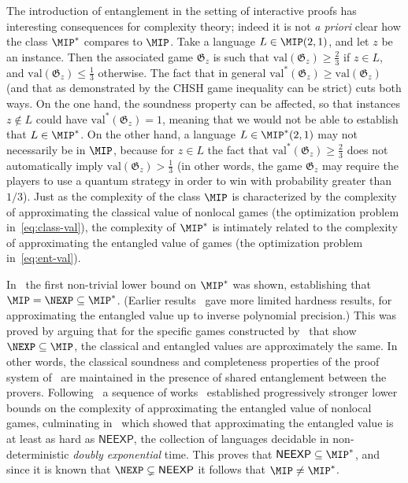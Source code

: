 \documentclass[11pt]{article}
\theoremstyle{definition}
\newcommand{\val}{\ensuremath{\mathrm{val}}}
\newcommand{\game}{\mathfrak{G}}
\newcommand{\class}[1]{\ensuremath{\mathsf{#1}}\xspace}
\newcommand{\NEEXP}{\class{NEEXP}} \newcommand{\NEEEXP}{\class{NEEEXP}}
\begin{document}
The introduction of entanglement in the setting of interactive proofs has interesting consequences for complexity theory; indeed it is not \emph{a priori} clear how the class $\MIP^*$ compares to $\MIP$. Take a language $L\in \MIP(2,1)$, and let $z$ be an instance. Then the associated game $\game_z$ is such that $\val(\game_z)\geq\frac{2}{3}$ if $z\in L$, and $\val(\game_z)\leq\frac{1}{3}$ otherwise. The fact that in general $\val^*(\game_z) \geq \val(\game_z)$ (and that as demonstrated by the CHSH game inequality can be strict) cuts both ways. On the one hand, the soundness property can be affected, so that instances $z\notin L$ could have $\val^*(\game_z) = 1$, meaning that we would not be able to establish that $L \in \MIP^*$.
On the other hand, a language $L \in \MIP^*(2,1)$ may not necessarily be in $\MIP$, because for $z\in L$ the fact that $\val^*(\game_z)\geq\frac{2}{3}$ does not automatically imply $\val(\game_z)> \frac{1}{3}$ (in other words, the game $\game_z$ may require the players to use a quantum strategy in order to win with probability greater than $1/3$). Just as the complexity of the class $\MIP$ is characterized by the complexity of approximating the classical value of nonlocal games (the optimization problem in~\eqref{eq:class-val}), the complexity of $\MIP^*$ is intimately related to the complexity of approximating the entangled value of games (the optimization problem in~\eqref{eq:ent-val}).


In~\cite{ito2012multi} the first non-trivial lower bound on $\MIP^*$ was shown, establishing that $\MIP = \NEXP \subseteq \MIP^*$. (Earlier results~\cite{kempe2011entangled,ito2009oracularization} gave more limited hardness results, for approximating the entangled value up to inverse polynomial precision.) This was proved by arguing that for the specific games constructed by~\cite{babai1991non} that show $\NEXP \subseteq \MIP$, the classical and entangled values are approximately the same. In other words, the classical soundness and completeness properties of the proof system of~\cite{babai1991non} are maintained in the presence of shared entanglement between the provers. 
Following~\cite{ito2012multi} a sequence of works~\cite{vidick2016three,ji2016classical,natarajan2018two,ji2017compression,natarajan2018low,fitzsimons2018quantum} established progressively stronger lower bounds on the complexity of approximating the entangled value of nonlocal games, culminating in~\cite{NW19} which showed that approximating the entangled value is at least as hard as $\NEEXP$, the collection of languages decidable in non-deterministic \emph{doubly exponential} time. This proves that $\NEEXP \subseteq \MIP^*$, and since it is known that $\NEXP\subsetneq \NEEXP$ it follows that $\MIP \neq \MIP^*$.
\end{document}
